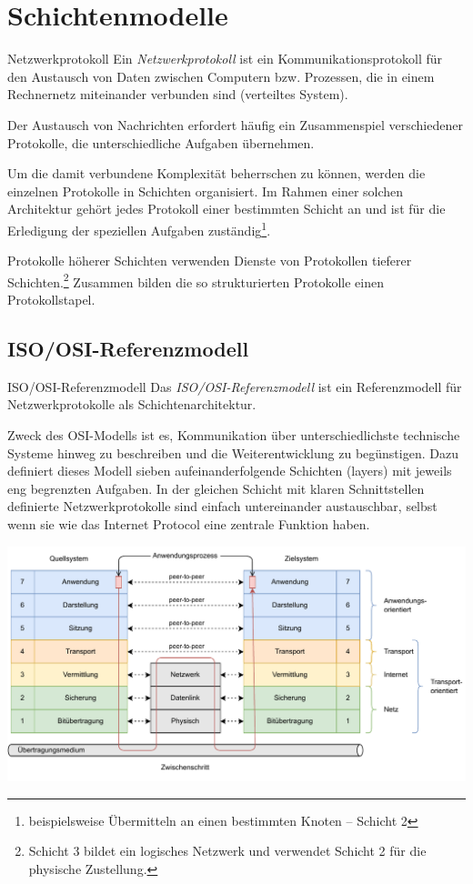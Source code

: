 \section{Schichtenmodelle}

\begin{defi}{Netzwerkprotokoll}
    Ein \emph{Netzwerkprotokoll}  ist ein Kommunikationsprotokoll für den Austausch von Daten zwischen Computern bzw. Prozessen, die in einem Rechnernetz miteinander verbunden sind (verteiltes System).

    Der Austausch von Nachrichten erfordert häufig ein Zusammenspiel verschiedener Protokolle, die unterschiedliche Aufgaben übernehmen.

    Um die damit verbundene Komplexität beherrschen zu können, werden die einzelnen Protokolle in Schichten organisiert.
    Im Rahmen einer solchen Architektur gehört jedes Protokoll einer bestimmten Schicht an und ist für die Erledigung der speziellen Aufgaben zuständig\footnote{beispielsweise Übermitteln an einen bestimmten Knoten – Schicht 2}.

    Protokolle höherer Schichten verwenden Dienste von Protokollen tieferer Schichten.\footnote{Schicht 3 bildet ein logisches Netzwerk und verwendet Schicht 2 für die physische Zustellung.}
    Zusammen bilden die so strukturierten Protokolle einen Protokollstapel.
\end{defi}

\subsection{ISO/OSI-Referenzmodell}

\begin{defi}{ISO/OSI-Referenzmodell}
    Das \emph{ISO/OSI-Referenzmodell} ist ein Referenzmodell für Netzwerkprotokolle als Schichtenarchitektur.

    Zweck des OSI-Modells ist es, Kommunikation über unterschiedlichste technische Systeme hinweg zu beschreiben und die Weiterentwicklung zu begünstigen.
    Dazu definiert dieses Modell sieben aufeinanderfolgende Schichten (layers) mit jeweils eng begrenzten Aufgaben. In der gleichen Schicht mit klaren Schnittstellen definierte Netzwerkprotokolle sind einfach untereinander austauschbar, selbst wenn sie wie das Internet Protocol eine zentrale Funktion haben.

    \centering
    \includegraphics[width=\textwidth]{includes/figures/defi_iso_osi.pdf}
\end{defi}

